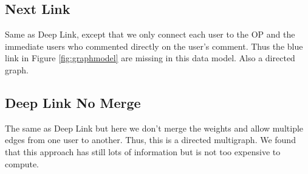 

\subsection{Next Link}
Same as Deep Link, except that we only connect each user to the OP and the immediate users who commented directly on the user's comment. Thus the blue link in Figure \ref{fig:graphmodel} are missing in this data model. Also a directed graph.

\subsection{Deep Link No Merge}
The same as Deep Link but here we don't merge the weights and allow multiple edges from one user to another. Thus, this is a directed multigraph. We found that this approach has still lots of information but is not too expensive to compute.











